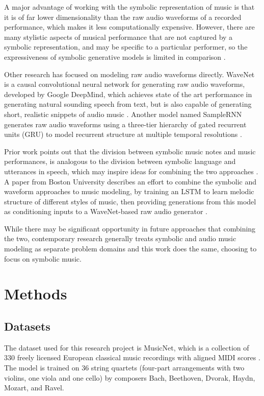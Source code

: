 \documentclass[sigconf,authorversion]{acmart}
\begin{document}
A major advantage of working with the symbolic representation of music
is that it is of far lower dimensionality than the raw audio waveforms
of a recorded performance, which makes it less computationally
expensive. However, there are many stylistic aspects of musical
performance that are not captured by a symbolic representation, and
may be specific to a particular performer, so the expressiveness of
symbolic generative models is limited in comparison
\cite{manzelli_conditioning_2018}.

Other research has focused on modeling raw audio waveforms directly. WaveNet is
a causal convolutional neural network for generating raw audio waveforms,
developed by Google DeepMind, which achieves state of the art performance in
generating natural sounding speech from text, but is also capable of generating
short, realistic snippets of audio music \cite{oord_wavenet_2016}.
Another model named SampleRNN generates raw audio waveforms using a three-tier
hierarchy of gated recurrent units (GRU) to model recurrent structure at
multiple temporal resolutions \cite{mehri_samplernn_2017}.

Prior work points out that the division between symbolic music notes
and music performances, is analogous to the division between symbolic
language and utterances in speech, which may inspire ideas for
combining the two approaches \cite{hawthorne2019enabling}. A paper
from Boston University describes an effort to combine the symbolic and
waveform approaches to music modeling, by training an LSTM to learn
melodic structure of different styles of music, then providing
generations from this model as conditioning inputs to a WaveNet-based
raw audio generator \cite{manzelli_conditioning_2018}.

While there may be significant opportunity in future approaches that
combining the two, contemporary research generally treats symbolic and
audio music modeling as separate problem domains and this work does
the same, choosing to focus on symbolic music.

\section{Methods}

\subsection{Datasets}

The dataset used for this research project is MusicNet, which is a
collection of 330 freely licensed European classical music recordings
with aligned MIDI scores \cite{thickstun2017learning}.  The model is
trained on 36 string quartets (four-part arrangements with two
violins, one viola and one cello) by composers Bach, Beethoven,
Dvorak, Haydn, Mozart, and Ravel.
\end{document}
